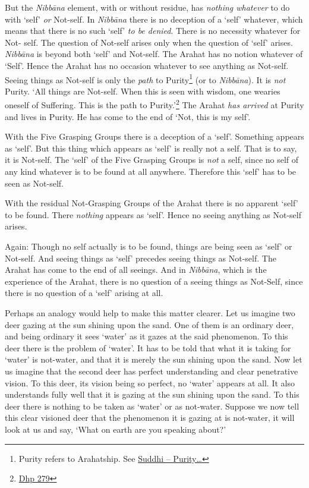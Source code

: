 But the \textit{Nibbāna} element, with or without residue, has \emph{nothing whatever} to do with `self' \emph{or} Not-self. In \textit{Nibbāna} there is no deception of a `self' whatever, which means that there is no such `self' \emph{to be denied}. There is no necessity whatever for Not- self. The question of Not-self arises only when the question of `self' arises. \textit{Nibbāna} is beyond both `self' and Not-self. The Arahat has no notion whatever of `Self'. Hence the Arahat has no occasion whatever to see anything as Not-self. Seeing things as Not-self is only the \emph{path} to Purity\footnote{Purity refers to Arahatship. See \protect\hyperlink{suddhi}{Suddhi -- Purity\ldots\hspace{0pt}}} (or to \textit{Nibbāna}). It is \emph{not} Purity. `All things are Not-self. When this is seen with wisdom, one wearies oneself of Suffering. This is the path to Purity.'\footnote{\href{https://suttacentral.net/dhp273-289/en/anandajoti}{Dhp 279}} The Arahat \emph{has arrived} at Purity and lives in Purity. He has come to the end of `Not, this is my self'.

With the Five Grasping Groups there is a deception of a `self'. Something appears as `self'. But this thing which appears as `self' is really not a self. That is to say, it is Not-self. The `self' of the Five Grasping Groups is \emph{not} a self, since no self of any kind whatever is to be found at all anywhere. Therefore this `self' has to be seen as Not-self.

With the residual Not-Grasping Groups of the Arahat there is no apparent `self' to be found. There \emph{nothing} appears as `self'. Hence no seeing anything as Not-self arises.

Again: Though no self actually is to be found, things are being seen as `self' or Not-self. And seeing things as `self' precedes seeing things as Not-self. The Arahat has come to the end of all seeings. And in \textit{Nibbāna}, which is the experience of the Arahat, there is no question of a seeing things as Not-Self, since there is no question of a `self' arising at all.

Perhaps an analogy would help to make this matter clearer. Let us imagine two deer gazing at the sun shining upon the sand. One of them is an ordinary deer, and being ordinary it sees `water' as it gazes at the said phenomenon. To this deer there is the problem of `water'. It has to be told that what it is taking for `water' is not-water, and that it is merely the sun shining upon the sand. Now let us imagine that the second deer has perfect understanding and clear penetrative vision. To this deer, its vision being so perfect, no `water' appears at all. It also understands fully well that it is gazing at the sun shining upon the sand. To this deer there is nothing to be taken as `water' or as not-water. Suppose we now tell this clear visioned deer that the phenomenon it is gazing at is not-water, it will look at us and say, `What on earth are you speaking about?'

